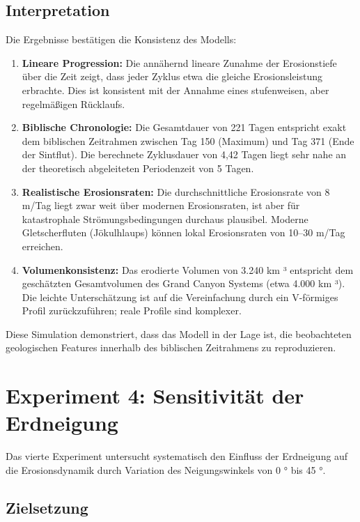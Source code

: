 ﻿\documentclass[12pt,a4paper]{report}
\begin{document}
\subsection{Interpretation}

Die Ergebnisse bestätigen die Konsistenz des Modells:

\begin{enumerate}
	\item \textbf{Lineare Progression:} Die annähernd lineare Zunahme der Erosionstiefe über die Zeit zeigt, dass jeder Zyklus etwa die gleiche Erosionsleistung erbrachte. Dies ist konsistent mit der Annahme eines stufenweisen, aber regelmäßigen Rücklaufs.
	
	\item \textbf{Biblische Chronologie:} Die Gesamtdauer von 221 Tagen entspricht exakt dem biblischen Zeitrahmen zwischen Tag 150 (Maximum) und Tag 371 (Ende der Sintflut). Die berechnete Zyklusdauer von 4,42 Tagen liegt sehr nahe an der theoretisch abgeleiteten Periodenzeit von 5 Tagen.
	
	\item \textbf{Realistische Erosionsraten:} Die durchschnittliche Erosionsrate von 8 m/Tag liegt zwar weit über modernen Erosionsraten, ist aber für katastrophale Strömungsbeding\-ungen durchaus plausibel. Moderne Gletscherfluten (Jökulhlaups) können lokal Erosionsraten von 10--30 m/Tag erreichen.
	
	\item \textbf{Volumenkonsistenz:} Das erodierte Volumen von 3.240 km ³ entspricht dem ge\-schätz\-ten Gesamtvolumen des Grand Canyon Systems (etwa 4.000 km ³). Die leichte Unterschätzung ist auf die Vereinfachung durch ein V-förmiges Profil zurückzuführen; reale Profile sind komplexer.
\end{enumerate}

Diese Simulation demonstriert, dass das Modell in der Lage ist, die beobachteten geologischen Features innerhalb des biblischen Zeitrahmens zu reproduzieren.

\section{Experiment 4: Sensitivität der Erdneigung}

Das vierte Experiment untersucht systematisch den Einfluss der Erdneigung auf die Erosionsdynamik durch Variation des Neigungswinkels von 0 ° bis 45 °.

\subsection{Zielsetzung}
\end{document}
